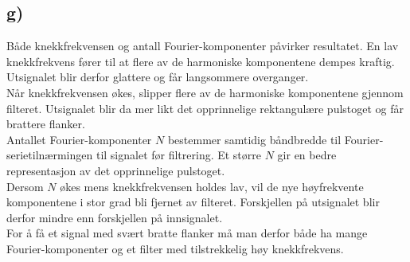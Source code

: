 \hypertarget{g}{}
\subsection*{g)}
Både knekkfrekvensen og antall Fourier-komponenter påvirker
resultatet. En lav knekkfrekvens fører til at flere av de harmoniske
komponentene dempes kraftig. Utsignalet blir derfor glattere
og får langsommere overganger.\\[1em]
Når knekkfrekvensen økes, slipper flere av de harmoniske
komponentene gjennom filteret. Utsignalet blir da mer likt
det opprinnelige rektangulære pulstoget og får brattere
flanker.\\[1em]
Antallet Fourier-komponenter $N$ bestemmer samtidig
båndbredde til Fourier-serietilnærmingen til signalet før filtrering. Et større $N$
gir en bedre representasjon av det opprinnelige pulstoget.\\[1em]
Dersom $N$ økes mens knekkfrekvensen holdes lav, vil de nye
høyfrekvente komponentene i stor grad bli fjernet av filteret.
Forskjellen på utsignalet blir derfor mindre enn forskjellen
på innsignalet.\\[1em]
For å få et signal med svært bratte flanker må man derfor både
ha mange Fourier-komponenter og et filter med tilstrekkelig høy
knekkfrekvens.